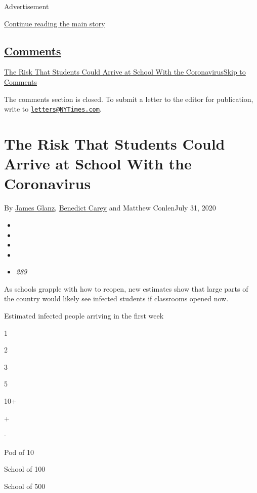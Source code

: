 Advertisement

\protect\hyperlink{after-top}{Continue reading the main story}

\hypertarget{comments}{%
\subsection{\texorpdfstring{\protect\hyperlink{commentsContainer}{Comments}}{Comments}}\label{comments}}

\href{}{The Risk That Students Could Arrive at School With the
Coronavirus}\href{}{Skip to Comments}

The comments section is closed. To submit a letter to the editor for
publication, write to
\href{mailto:letters@NYTimes.com}{\nolinkurl{letters@NYTimes.com}}.

\hypertarget{the-risk-that-students-could-arrive-at-school-with-the-coronavirus}{%
\section{The Risk That Students Could Arrive at School With the
Coronavirus}\label{the-risk-that-students-could-arrive-at-school-with-the-coronavirus}}

By \href{https://www.nytimes3xbfgragh.onion/by/james-glanz}{James
Glanz},
\href{https://www.nytimes3xbfgragh.onion/by/benedict-carey}{Benedict
Carey} and Matthew ConlenJuly 31, 2020

\begin{itemize}
\item
\item
\item
\item
\item
  \emph{289}
\end{itemize}

As schools grapple with how to reopen, new estimates show that large
parts of the country would likely see infected students if classrooms
opened now.

Estimated infected people arriving in the first week

1

2

3

5

10+

+

-

Pod of 10

School of 100

School of 500

